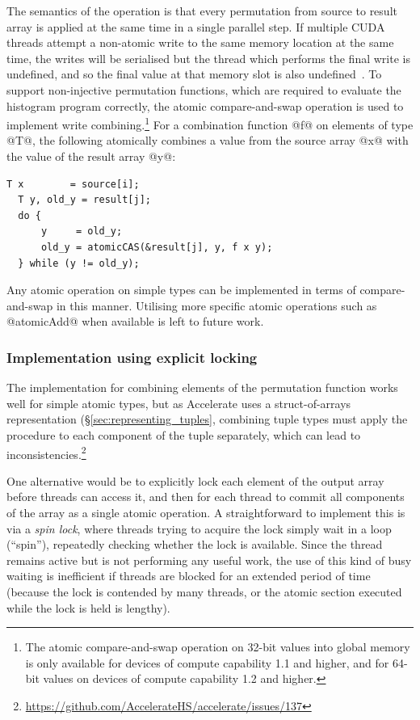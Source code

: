 The semantics of the operation is that every permutation from source to result
array is applied at the same time in a single parallel step. If multiple CUDA
threads attempt a non-atomic write to the same memory location at the same time,
the writes will be serialised but the thread which performs the final write is
undefined, and so the final value at that memory slot is also
undefined~\cite{NVIDIA:2012wf}. To support non-injective permutation functions,
which are required to evaluate the histogram program correctly, the atomic
compare-and-swap operation is used to implement write combining.\footnote{The
atomic compare-and-swap operation on 32-bit values into global memory is only
available for devices of compute capability 1.1 and higher, and for 64-bit
values on devices of compute capability 1.2 and higher.} For a combination
function @f@ on elements of type @T@, the following atomically combines a value
from the source array @x@ with the value of the result array @y@:

\begin{lstlisting}[style=cuda]
  T x        = source[i];
  T y, old_y = result[j];
  do {
      y     = old_y;
      old_y = atomicCAS(&result[j], y, f x y);
  } while (y != old_y);
\end{lstlisting}
%
Any atomic operation on simple types can be implemented in terms of
compare-and-swap in this manner. Utilising more specific atomic operations such
as @atomicAdd@ when available is left to future work.


\subsubsection{Implementation using explicit locking}

The implementation for combining elements of the permutation function works well
for simple atomic types, but as Accelerate uses a struct-of-arrays
representation (\S\ref{sec:representing_tuples}, combining tuple types must
apply the procedure to each component of the tuple separately, which can lead to
inconsistencies.\footnote{\url{https://github.com/AccelerateHS/accelerate/issues/137}}

One alternative would be to explicitly lock each element of the output array
before threads can access it, and then for each thread to commit all components
of the array as a single atomic operation. A straightforward to implement this
is via a \emph{spin lock}, where threads trying to acquire the lock simply wait
in a loop (``spin''), repeatedly checking whether the lock is available. Since
the thread remains active but is not performing any useful work, the use of this
kind of busy waiting is inefficient if threads are blocked for an extended
period of time (because the lock is contended by many threads, or the atomic
section executed while the lock is held is lengthy).

